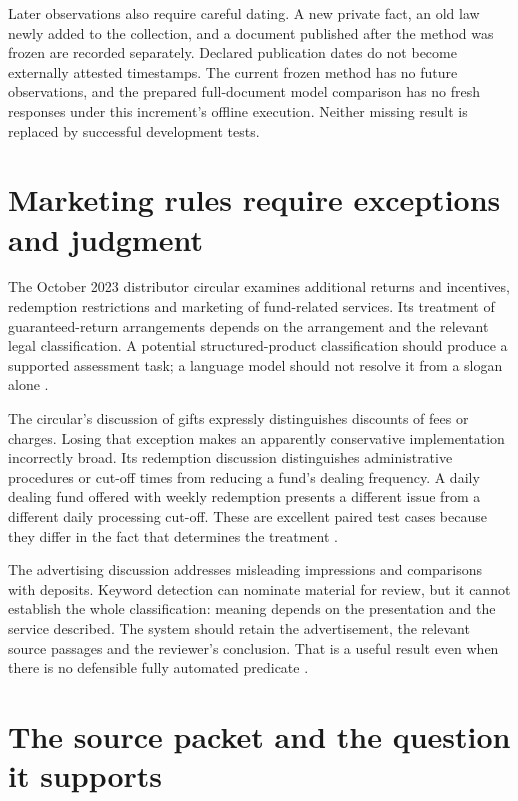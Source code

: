 \documentclass[12pt,a4paper,oneside,openany]{book}
\begin{document}
Later observations also require careful dating. A new private fact, an old
law newly added to the collection, and a document published after the method
was frozen are recorded separately. Declared publication dates do not become
externally attested timestamps. The current frozen method has no future
observations, and the prepared full-document model comparison has no fresh
responses under this increment's offline execution. Neither missing result
is replaced by successful development tests.


\section{Marketing rules require exceptions and judgment}
\label{merge:P-01-problem:04}


The October 2023 distributor circular examines additional returns and incentives,
redemption restrictions and marketing of fund-related services. Its treatment of
guaranteed-return arrangements depends on the arrangement and the relevant legal
classification. A potential structured-product classification should produce a
supported assessment task; a language model should not resolve it from a slogan
alone \citep[paras.~5--11]{sfcmarketing}.

The circular's discussion of gifts expressly distinguishes discounts of fees or
charges. Losing that exception makes an apparently conservative implementation
incorrectly broad. Its redemption discussion distinguishes administrative
procedures or cut-off times from reducing a fund's dealing frequency. A daily
dealing fund offered with weekly redemption presents a different issue from a
different daily processing cut-off. These are excellent paired test cases because
they differ in the fact that determines the treatment
\citep[paras.~9--14]{sfcmarketing}.

The advertising discussion addresses misleading impressions and comparisons with
deposits. Keyword detection can nominate material for review, but it cannot
establish the whole classification: meaning depends on the presentation and the
service described. The system should retain the advertisement, the relevant
source passages and the reviewer's conclusion. That is a useful result even when
there is no defensible fully automated predicate
\citep[paras.~15--17]{sfcmarketing}.

\section{The source packet and the question it supports}
\label{merge:M02:00}
\end{document}

